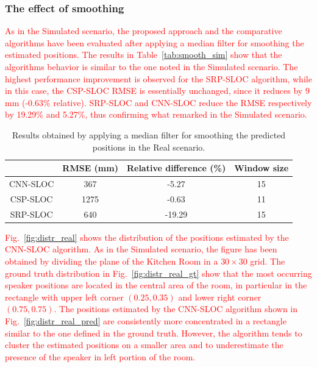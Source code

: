 \documentclass[review]{elsarticle}
\newcommand{\figref}[1]{Fig.~\ref{#1}}
\newcommand{\tableref}[1]{Table~\ref{#1}}
\begin{document}
\subsubsection{The effect of smoothing}
\textcolor{red}{
As in the Simulated scenario, the proposed approach and the comparative algorithms have been evaluated after applying a median filter for smoothing the estimated positions. The results in \tableref{tab:smooth_sim} show that the algorithms behavior is similar to the one noted in the Simulated scenario. The highest performance improvement is observed for the SRP-SLOC algorithm, while in this case, the CSP-SLOC RMSE is essentially unchanged, since it reduces by 9\,mm (-0.63\% relative). SRP-SLOC and CNN-SLOC reduce the RMSE respectively by 19.29\% and 5.27\%, thus confirming what remarked in the Simulated scenario.
}

\begin{table}[t]
\centering
\caption{Results obtained by applying a median filter for smoothing the predicted positions in the Real scenario.}\label{tab:smooth_real}
\begin{tabular}{c | c | c | c}
  	 				& RMSE (mm) & Relative difference (\%) & Window size \\
\hline
CNN-SLOC    & 367 & -5.27 & 15 \\
CSP-SLOC    & 1275 & -0.63 & 11\\
SRP-SLOC    & 640 & -19.29 & 15\\
\end{tabular}
\end{table}

\textcolor{red}{
\figref{fig:distr_real} shows the distribution of the positions estimated by the CNN-SLOC algorithm. As in the Simulated scenario, the figure has been obtained by dividing the plane of the Kitchen Room in a $30 \times 30$ grid. The ground truth distribution in \figref{fig:distr_real_gt} show that the most occurring speaker positions are located in the central area of the room, in particular in the rectangle with upper left corner $(0.25, 0.35)$ and lower right corner $(0.75, 0.75)$. The positions estimated by the CNN-SLOC algorithm shown in \figref{fig:distr_real_pred} are consistently more concentrated in a rectangle similar to the one defined in the ground truth. However, the algorithm tends to cluster the estimated positions on a smaller area and to underestimate the presence of the speaker in left portion of the room.
}
\end{document}
